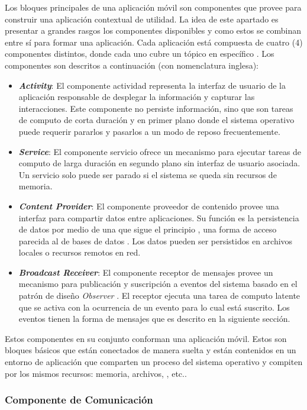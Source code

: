 Los bloques principales de una aplicación móvil son componentes que
 provee para construir una aplicación contextual de
utilidad. La idea de este apartado es presentar a grandes rasgos los
componentes disponibles y como estos se combinan entre sí para formar
una aplicación. Cada aplicación está compuesta de cuatro (4) componentes
distintos, donde cada uno cubre un tópico en específico \cite{Gargenta2014}.
Los componentes son descritos a continuación (con nomenclatura inglesa):
\begin{itemize}
\item \textbf{\emph{Activity}}: El componente actividad representa la interfaz
de usuario de la aplicación responsable de desplegar la información
y capturar las interacciones. Este componente no persiste información,
sino que son tareas de computo de corta duración y en primer plano
donde el sistema operativo puede requerir pararlos y pasarlos a un
modo de reposo frecuentemente.
\item \textbf{\emph{Service}}: El componente servicio ofrece un mecanismo
para ejecutar tareas de computo de larga duración en segundo plano
sin interfaz de usuario asociada. Un servicio solo puede ser parado
si el sistema se queda sin recursos de memoria.
\item \textbf{\emph{Content Provider}}: El componente proveedor de contenido
provee una interfaz para compartir datos entre aplicaciones. Su función
es la persistencia de datos por medio de una  que sigue
el principio , una forma de acceso parecida al de bases
de datos . Los datos pueden ser persistidos en archivos
locales o recursos remotos en red.
\item \textbf{\emph{Broadcast Receiver}}: El componente receptor de mensajes
provee un mecanismo para publicación y suscripción a eventos del sistema
basado en el patrón de diseño \emph{Observer} \cite{Shalloway2004}.
El receptor ejecuta una tarea de computo latente que se activa con
la ocurrencia de un evento para lo cual está suscrito. Los eventos
tienen la forma de mensajes que es descrito en la siguiente sección.
\end{itemize}
Estos componentes en su conjunto conforman una aplicación móvil. Estos
son bloques básicos que están conectados de manera suelta y están
contenidos en un entorno de aplicación que comparten un proceso del
sistema operativo y compiten por los mismos recursos: memoria, archivos,
, etc..

\subsubsection{Componente de Comunicación}

